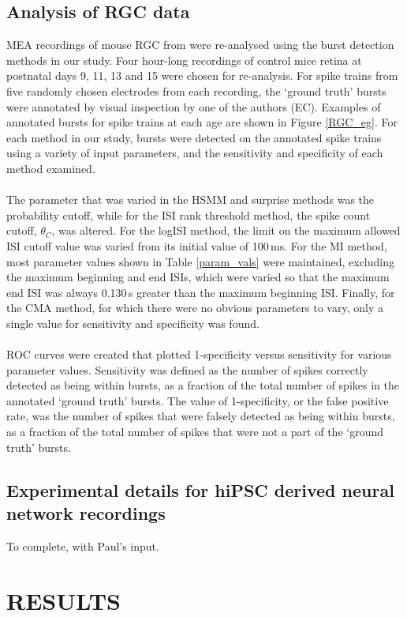 \documentclass[12pt, titlepage]{article}
\begin{document}
\subsection*{Analysis of RGC data}
 MEA recordings of mouse RGC from \cite{Demas2003} were re-analysed using the burst detection methods in our study. Four hour-long recordings of  control mice retina at postnatal days 9, 11, 13 and 15 were chosen for re-analysis. For spike trains from five randomly chosen electrodes from each recording, the `ground truth' bursts were annotated by visual inspection by one of the authors (EC). Examples of annotated bursts for spike trains at each age are shown in Figure \ref{RGC_eg}. For each method in our study, bursts were detected on the annotated spike trains using a variety of input parameters, and the sensitivity and specificity of each method examined.
 \\ \\The parameter that was varied in the HSMM and surprise methods was the probability cutoff, while for the ISI rank threshold method, the spike count cutoff, $\theta_C$, was altered. For the logISI method, the limit on the maximum allowed ISI cutoff value was varied from its initial value of 100$\,$ms. For the MI method, most parameter values shown in Table \ref{param_vals} were maintained, excluding the maximum beginning and end ISIs, which were varied so that the maximum end ISI was always 0.130$\,$s greater than the maximum beginning ISI. Finally, for the CMA method, for which there were no obvious parameters to vary, only a single value for sensitivity and specificity was found.
 \\ \\ ROC curves were created that plotted 1-specificity versus sensitivity for various parameter values. Sensitivity was defined as the number of spikes correctly detected as being within bursts, as a fraction of the total number of spikes in the annotated `ground truth' bursts. The value of 1-specificity, or the false positive rate, was the number of spikes that were falsely detected as being within bursts, as a fraction of the total number of spikes that were not a part of the `ground truth' bursts.
 \subsection*{Experimental details for hiPSC derived neural network recordings}
 To complete, with Paul's input.
\section*{RESULTS}
\end{document}
